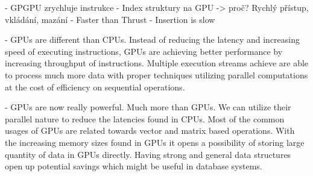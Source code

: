 - GPGPU zrychluje instrukce
- Index struktury na GPU -> proč? Rychlý přístup, vkládání, mazání
- Faster than Thrust
- Insertion is slow

- GPUs are different than CPUs. Instead of reducing the latency and increasing speed of executing instructions, GPUs are achieving better performance by increasing throughput of instructions. Multiple execution streams achieve are able to process much more data with proper techniques utilizing parallel computations at the cost of efficiency on sequential operations.

- GPUs are now really powerful. Much more than GPUs. We can utilize their parallel nature to reduce the latencies found in CPUs. Most of the common usages of GPUs are related towards vector and matrix based operations. With the increasing memory sizes found in GPUs it opens a possibility of storing large quantity of data in GPUs directly. Having strong and general data structures open up potential savings which might be useful in database systems.